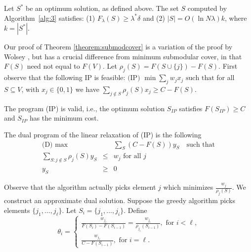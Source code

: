 \begin{theorem}
\label{theorem:submodcover}
Let $S^*$ be an optimum solution, as defined above.
The set $S$ computed by  Algorithm~\ref{alg:3} satisfies: (1) $F_{\lambda}(S)\geq \lambda^*\delta$ and (2) $|S| = O(\ln{N\lambda})k$, where $k=|S^*|$.
\end{theorem}

Our proof of Theorem \ref{theorem:submodcover} is a variation of the proof by Wolsey
\cite{wolsey:combinatorica82}, but has a crucial difference from minimum submodular cover, in that $F(S)$ need not equal to $F(V)$. 
Let $\rho_j(S) = F(S\cup\{j\}) - F(S)$. First observe that the following IP
is feasible:
$\mbox{(IP) } \min  \sum_j w_j x_j \mbox{ such that}$ for all $S\subseteq V$, with
$x_j \in \{0, 1\}$ we have
$\sum_{j\not\in S} \rho_j(S) x_j \geq C - F(S)$.



\begin{lemma}
\label{lem:ipfeasible}
The program (IP) is valid, i.e., the optimum solution $S_{IP}$ satisfies $F(S_{IP}) \geq C$
and $S_{IP}$ has the minimum cost.
\end{lemma}
%
The dual program of the linear relaxation of (IP) is the following
%
\begin{eqnarray*}
\mbox{(D) } \max && \sum_S (C-F(S)) y_S \quad \mbox{such that}\\
\sum_{S: j\not\in S} \rho_j(S) y_S &\leq& w_j \mbox{ for all $j$}\\
y_S &\geq& 0
\end{eqnarray*}

Observe that the algorithm actually picks element $j$ which minimizes $\frac{w_j}{\rho_j(S)}$.
We construct an approximate dual solution. Suppose the greedy algorithm picks
elements $\{j_1,\ldots, j_{\ell}\}$. Let $S_i = \{j_1,\ldots, j_i\}$. Define
\[
\theta_i =
\begin{cases}
\frac{w_{j_i}}{F(S_i) - F(S_{i-1})} = \frac{w_{j_i}}{\rho_{j_i}(S_{i-1})}, \mbox{ for $i<\ell$,}\\
\frac{w_{j_{\ell}}}{C - F(S_{i-1})}, \mbox{ for $i=\ell$.}
\end{cases}
\]

